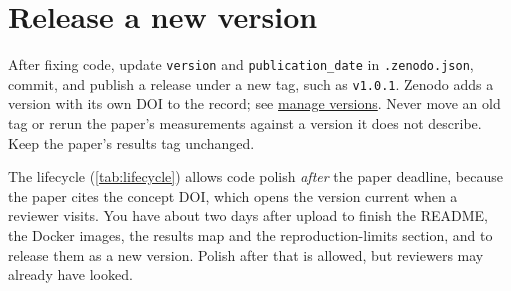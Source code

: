 \section{Release a new version}\label{app:zenodo:versions}
After fixing code, update \texttt{version} and \texttt{publication\_date} in \texttt{.zenodo.json}, commit, and publish a release under a new tag, such as \texttt{v1.0.1}. Zenodo adds a version with its own DOI to the record; see \href{https://help.zenodo.org/docs/deposit/manage-versions/}{manage versions}. Never move an old tag or rerun the paper's measurements against a version it does not describe. Keep the paper's results tag unchanged.

The lifecycle (\cref{tab:lifecycle}) allows code polish \emph{after} the paper deadline, because the paper cites the concept DOI, which opens the version current when a reviewer visits. You have about two days after upload to finish the README, the Docker images, the results map and the reproduction-limits section, and to release them as a new version. Polish after that is allowed, but reviewers may already have looked.
